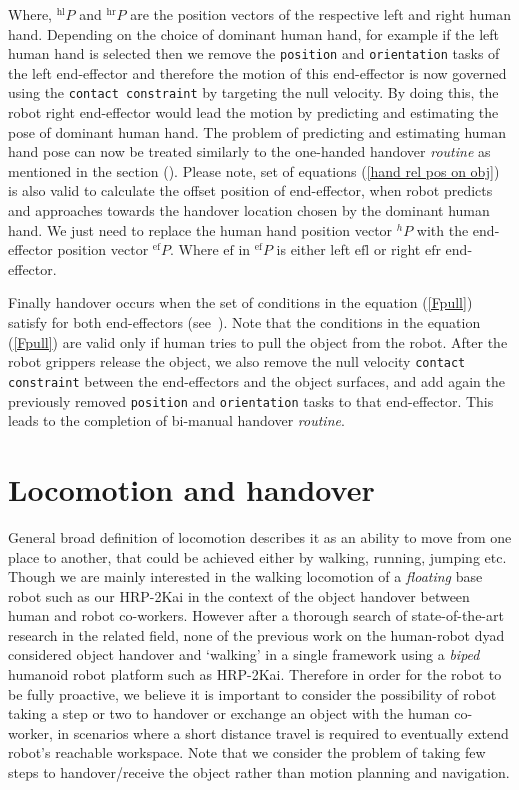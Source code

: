 Where, ${}^\text{hl}{P}$ and ${}^\text{hr}{P}$ are the position vectors of the respective left and right human hand. Depending on the choice of dominant human hand, for example if the left human hand is selected then we remove the \texttt{position} and \texttt{orientation} tasks of the left end-effector and therefore the motion of this end-effector is now governed using the \texttt{contact constraint} by targeting the null velocity. By doing this, the robot right end-effector would lead the motion by predicting and estimating the pose of dominant human hand. The problem of predicting and estimating human hand pose can now be treated similarly to the one-handed handover \textit{routine} as mentioned in the section (). Please note, set of equations (\ref{hand rel pos on obj}) is also valid to calculate the offset position of end-effector, when robot predicts and approaches towards the handover location chosen by the dominant human hand. We just need to replace the human hand position vector ${}^{h}{P}$ with the end-effector position vector ${}^{\text{ef}}{P}$. Where $\text{ef}$ in ${}^{\text{ef}}{P}$ is either left $\text{efl}$ or right $\text{efr}$ end-effector.


Finally handover occurs when the set of conditions in the equation (\ref{Fpull}) satisfy for both end-effectors (see~). Note that the conditions in the equation (\ref{Fpull}) are valid only if human tries to pull the object from the robot. After the robot grippers release the object, we also remove the null velocity \texttt{contact constraint} between the end-effectors and the object surfaces, and add again the previously removed \texttt{position} and \texttt{orientation} tasks to that end-effector. This leads to the completion of bi-manual handover \textit{routine}. 


\section{Locomotion and handover}\label{locomotion}

General broad definition of locomotion describes it as an ability to move from one place to another, that could be achieved either by walking, running, jumping etc. Though we are mainly interested in the walking locomotion of a \textit{floating} base robot such as our HRP-2Kai in the context of the object handover between human and robot co-workers. However after a thorough search of state-of-the-art research in the related field, none of the previous work on the human-robot dyad considered object handover and `walking' in a single framework using a \textit{biped} humanoid robot platform such as HRP-2Kai. Therefore in order for the robot to be fully proactive, we believe it is important to consider the possibility of robot taking a step or two to handover or exchange an object with the human co-worker, in scenarios where a short distance travel is required to eventually extend robot's reachable workspace. Note that we consider the problem of taking few steps to handover/receive the object rather than motion planning and navigation.

